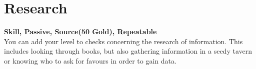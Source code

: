 \section{Research}\label{sec:research}
\textbf{Skill, Passive, Source(50 Gold), Repeatable}\\
You can add your level to checks concerning the research of information.
This includes looking through books, but also gathering information in a seedy tavern or knowing who to ask for favours in order to gain data.